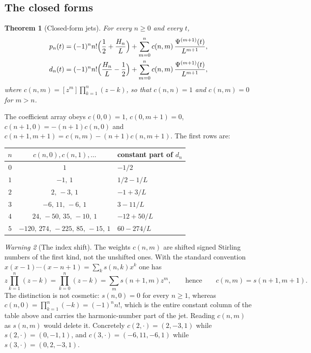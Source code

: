 \documentclass[11pt,oneside]{article}
\newtheorem{theorem}{Theorem}[section]
\theoremstyle{definition}
\theoremstyle{remark}
\newtheorem{warning}[theorem]{Warning}
\begin{document}
\subsection{The closed forms}

\begin{theorem}[Closed-form jets]\label{smallarg:thm:jets}
For every $n\ge0$ and every $t$,
\[
\begin{aligned}
  p_n(t)&=(-1)^nn!\Bigl(\frac12+\frac{H_n}{L}\Bigr)
    +\sum_{m=0}^{n}c(n,m)\,\frac{\Psi^{(m+1)}(t)}{L^{m+1}},\\
  d_n(t)&=(-1)^nn!\Bigl(\frac{H_n}{L}-\frac12\Bigr)
    +\sum_{m=0}^{n}c(n,m)\,\frac{\Psi^{(m+1)}(t)}{L^{m+1}},
\end{aligned}
\]
where $c(n,m)=[z^m]\prod_{k=1}^n(z-k)$, so that $c(n,n)=1$ and $c(n,m)=0$ for
$m>n$.
\end{theorem}

The coefficient array obeys $c(0,0)=1$, $c(0,m+1)=0$,
$c(n+1,0)=-(n+1)c(n,0)$ and $c(n+1,m+1)=c(n,m)-(n+1)c(n,m+1)$.  The first rows
are:

\begin{center}
\begin{tabular}{@{}ccl@{}}
\toprule
$n$ & $c(n,0),c(n,1),\dots$ & constant part of $d_n$\\
\midrule
$0$ & $1$ & $-1/2$\\
$1$ & $-1,\,1$ & $1/2-1/L$\\
$2$ & $2,\,-3,\,1$ & $-1+3/L$\\
$3$ & $-6,\,11,\,-6,\,1$ & $3-11/L$\\
$4$ & $24,\,-50,\,35,\,-10,\,1$ & $-12+50/L$\\
$5$ & $-120,\,274,\,-225,\,85,\,-15,\,1$ & $60-274/L$\\
\bottomrule
\end{tabular}
\end{center}

\begin{warning}[The index shift]
The weights $c(n,m)$ are shifted signed Stirling numbers of the first kind,
not the unshifted ones.  With the standard convention
$x(x-1)\cdots(x-n+1)=\sum_k s(n,k)x^k$ one has
\[
  z\prod_{k=1}^{n}(z-k)=\prod_{k=0}^{n}(z-k)=\sum_{m}s(n+1,m)z^m,
  \qquad\text{hence}\qquad c(n,m)=s(n+1,m+1).
\]
The distinction is not cosmetic: $s(n,0)=0$ for every $n\ge1$, whereas
$c(n,0)=\prod_{k=1}^n(-k)=(-1)^nn!$, which is the entire constant column of
the table above and carries the harmonic-number part of the jet.  Reading
$c(n,m)$ as $s(n,m)$ would delete it.  Concretely $c(2,\cdot)=(2,-3,1)$ while
$s(2,\cdot)=(0,-1,1)$, and $c(3,\cdot)=(-6,11,-6,1)$ while
$s(3,\cdot)=(0,2,-3,1)$.
\end{warning}
\end{document}
